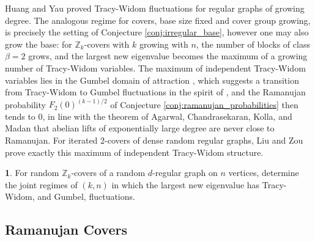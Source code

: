 \documentclass[12pt,oneside,english]{amsart}
\numberwithin{equation}{section}
\numberwithin{figure}{section}
\numberwithin{table}{section}
\theoremstyle{plain}
\numberwithin{thm}{section}
\theoremstyle{plain}
\theoremstyle{plain}
\theoremstyle{plain}
\theoremstyle{definition}
\theoremstyle{definition}
\theoremstyle{definition}
\newtheorem{problem}[thm]{\protect\problemname}
\theoremstyle{remark}
\providecommand{\problemname}{Problem}
\begin{document}
Huang and Yau \cite{HuangYau2023} proved Tracy-Widom fluctuations
for regular graphs of growing degree. The analogous regime for covers,
base size fixed and cover group growing, is precisely the setting
of Conjecture \ref{conj:irregular_base}, however one may also grow
the base: for $\mathbb{Z}_{k}$-covers with $k$ growing with $n$,
the number of blocks of class $\beta=2$ grows, and the largest new
eigenvalue becomes the maximum of a growing number of Tracy-Widom
variables. The maximum of independent Tracy-Widom variables lies in
the Gumbel domain of attraction \cite{ChetelatNarayananWells2018},
which suggests a transition from Tracy-Widom to Gumbel fluctuations
in the spirit of \cite{Johansson2007}, and the Ramanujan probability
$F_{2}(0)^{(k-1)/2}$ of Conjecture \ref{conj:ramanujan_probabilities}
then tends to $0$, in line with the theorem of Agarwal, Chandrasekaran,
Kolla, and Madan \cite{AgarwalChandrasekaranKollaMadan2019} that
abelian lifts of exponentially large degree are never close to Ramanujan.
For iterated $2$-covers of dense random regular graphs, Liu and Zou
\cite{LiuZou2025} prove exactly this maximum of independent Tracy-Widom
structure.
\begin{problem}
\label{prob:gumbel}For random $\mathbb{Z}_{k}$-covers of a random
$d$-regular graph on $n$ vertices, determine the joint regimes of
$(k,n)$ in which the largest new eigenvalue has Tracy-Widom, and
Gumbel, fluctuations.
\end{problem}

\subsection*{Ramanujan Covers}
\end{document}
